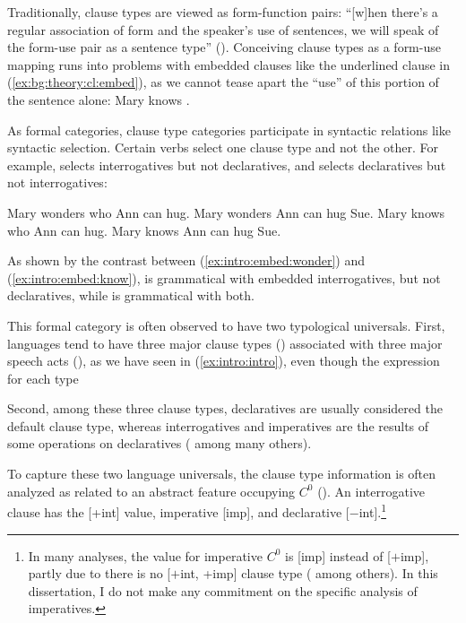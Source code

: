 Traditionally, clause types are viewed as form-function pairs: ``[w]hen there's a regular association of form and the speaker's use of sentences, we will speak of the form-use pair as a sentence type'' (\cite[156]{sz1985speechact}). Conceiving clause types as a form-use mapping runs into problems with embedded clauses like the underlined clause in (\ref{ex:bg:theory:cl:embed}), as we cannot tease apart the ``use'' of  this portion of the sentence alone:
Mary knows .
\eex

As formal categories, clause type categories participate in syntactic relations like syntactic  selection. Certain verbs select one clause type and not the other. For example,  selects interrogatives but not declaratives, and  selects declaratives but not interrogatives:

\bxl
Mary wonders who Ann can hug.
\ex *Mary wonders Ann can hug Sue.
\exl
\ex \label{ex:intro:embed:know}
\bxl
Mary knows who Ann can hug.
\ex Mary knows Ann can hug Sue.
\exl
\eex

As shown by the contrast between (\ref{ex:intro:embed:wonder}) and (\ref{ex:intro:embed:know}),  is grammatical with embedded interrogatives, but not declaratives, while  is grammatical with both.



This formal category is often observed to have two typological universals. First, languages tend to have three major clause types (\diis{}) associated with three major speech acts (\aqrs{}), as we have seen in (\ref{ex:intro:intro}), even though the expression for each type 

Second, among these three clause types, declaratives are usually considered the default clause type, whereas interrogatives and imperatives are the results of some operations on declaratives (\cite{sz1985speechact, chomsky1957,chomsky1995minimalist, akmajian1984clausetype, platzack1997imp,rizzi1997} among many others). 



To capture these two language universals, the clause type information is often analyzed as related to an abstract feature occupying $C^{0}$ (\cite{chomsky1995minimalist, cheng1991, rizzi1997, rizzi2001int, chomskylasnik1977,platzack1997imp,akmajian1984clausetype, han1998imp}). An interrogative clause has the [+int] value, imperative [imp], and declarative [$-$int].\footnote{In many analyses, the value for imperative $C^{0}$ is [imp] instead of [$+$imp], partly due to there is no [$+$int, +imp] clause type (\cite{platzack1997imp,han1998imp} among others). In this dissertation, I do not make any commitment on the specific analysis of imperatives.} 



